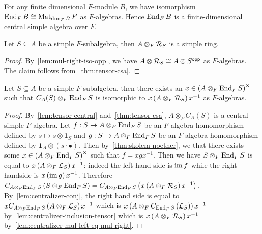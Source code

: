  \begin{remark}
   For any finite dimensional $F$-module $B$, we have isomorphism
   $\operatorname{End}_{F}B \cong \operatorname{Mat}_{\dim_{F}B}F$ as $F$-algebras. Hence $\operatorname{End}_{F} B$ is a
   finite-dimensional central simple algebra over $F$.
 \end{remark}

 \begin{lemma}\label{lem:tensor-mul-right-simple}
   Let $S\subseteq A$ be a simple $F$-subalgebra, then
   $A \otimes_{F} \mathcal{R}_{S}$ is a simple ring.
   \leanok
 \end{lemma}

 \begin{proof}
   By~\cref{lem:mul-right-iso-opp}, we have
   $A\otimes \mathcal{R}_{S}\cong A\otimes S^{\mathsf{opp}}$ as $F$-algebras. The claim follows
   from~\cref{thm:tensor-csa}.
 \end{proof}

 \begin{lemma}\label{lem:centralizer-tensor-end-eq-conj-tensor-mul-right}
   Let $S\subseteq A$ be a simple $F$-subalgebra, then there
   exists an $x\in \left(A\otimes_{F}\operatorname{End}_{F}S\right)^{\times}$ such that
   $C_{A}(S)\otimes_{F}\operatorname{End}_{F}S$ is isomorphic to
   $x\left(A\otimes_{F}\mathcal{R}_{S}\right)x^{-1}$ as $F$-algebras.
   \leanok
 \end{lemma}

 \begin{proof}
   By~\cref{lem:tensor-central} and~\cref{thm:tensor-csa},
   $A \otimes_{F}C_{A}(S)$ is a central simple $F$-algebra. Let
   $f : S \to A\otimes_{F}\operatorname{End}_{F}S$ be an $F$-algebra homomorphism defined by
   $s \mapsto s \otimes \mathbf{1}_{S}$ and $g : S \to A \otimes_{F}\operatorname{End}_{F}S$
   be an $F$-algebra homomorphism defined by
   $\mathbf{1}_{A} \otimes \left(s\cdot\bullet\right)$. Then
   by~\cref{thm:skolem-noether}, we that there exists some
   $x\in \left(A\otimes_{F}\operatorname{End}_{F}S\right)^{\times}$ such that $f = xgx^{-1}$.
   Then we have $S\otimes_{F}\operatorname{End}_{F}S$ is equal to
   $x\left(A\otimes_{F}\mathcal{L}_{S}\right)x^{-1}$: indeed the left hand side is
   $\operatorname{im} f$ while the right handside is $x\left(\operatorname{im} g\right)x^{-1}$. Therefore
   $C_{A\otimes_{F}\operatorname{End}_{F}S}\left(S\otimes_{F}\operatorname{End}_{F}S\right) = C_{A\otimes_{F}\operatorname{End}_{F}S}\left(x\left(A\otimes_{F}\mathcal{R}_{S}\right)x^{-1}\right)$.
   By~\cref{lem:centralizer-conj}, the right hand side is equal to
   $xC_{A\otimes_{F}\operatorname{End}_{F}S}\left(A\otimes_{F}\mathcal{L}_{S}\right)x^{-1}$ which is
   $x\left(A\otimes_{F}C_{\operatorname{End}_{F}S}\left(\mathcal{L}_{S}\right)\right)x^{-1}$
   by~\cref{lem:centralizer-inclusion-tensor} which is
   $x\left(A\otimes_{F}\mathcal{R}_{S}\right)x^{-1}$
   by~\cref{lem:centralizer-mul-left-eq-mul-right}.
 \end{proof}

